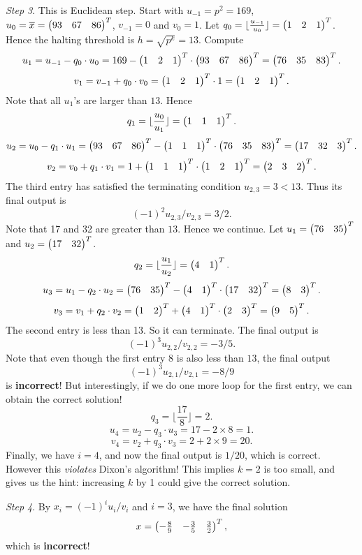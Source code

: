 \documentclass[12pt]{article}
\theoremstyle{plain}
\begin{document}
\emph{Step 3}. This is Euclidean step. Start with $u_{-1} = p^2 = 169$, $u_0=\overline{x} = \begin{pmatrix}93 & 67 & 86\end{pmatrix}^T$, $v_{-1} = 0$ and $v_0=1$. Let $q_0 = \lfloor \frac{u_{-1}}{u_0} \rfloor = \begin{pmatrix}1 & 2 & 1\end{pmatrix}^T$. Hence the halting threshold is $h = \sqrt{p^k} = 13$. Compute
$$u_1 = u_{-1} - q_0\cdot u_0 = 169 - \begin{pmatrix}1 & 2 & 1\end{pmatrix}^T \cdot \begin{pmatrix}93 & 67 & 86\end{pmatrix}^T = \begin{pmatrix}76 & 35 & 83\end{pmatrix}^T.$$
$$v_1 = v_{-1} + q_0\cdot v_0 = \begin{pmatrix}1 & 2 & 1\end{pmatrix}^T \cdot 1 = \begin{pmatrix}1 & 2 & 1\end{pmatrix}^T.$$
Note that all $u_1$'s are larger than $13$. Hence
$$q_1 = \lfloor \frac{u_0}{u_1} \rfloor = \begin{pmatrix}1 & 1 & 1\end{pmatrix}^T.$$
$$u_2 = u_0 - q_1\cdot u_1 = \begin{pmatrix}93 & 67 & 86\end{pmatrix}^T - \begin{pmatrix}1 & 1 & 1\end{pmatrix}^T \cdot \begin{pmatrix}76 & 35 & 83\end{pmatrix}^T = \begin{pmatrix}17 & 32 & 3\end{pmatrix}^T.$$
$$v_2 = v_0 + q_1\cdot v_1 = 1 + \begin{pmatrix}1 & 1 & 1\end{pmatrix}^T \cdot \begin{pmatrix}1 & 2 & 1\end{pmatrix}^T = \begin{pmatrix}2&3&2\end{pmatrix}^T.$$
The third entry has satisfied the terminating condition $u_{2,3} = 3 < 13$. Thus its final output is 
$$(-1)^2u_{2,3}/v_{2,3} = 3/2.$$
Note that 17 and 32 are greater than $13$. Hence we continue. Let $u_1 = \begin{pmatrix}76 & 35\end{pmatrix}^T$ and $u_2 = \begin{pmatrix}17 & 32\end{pmatrix}^T$.
$$q_2 = \lfloor \frac{u_1}{u_2} \rfloor = \begin{pmatrix}4 & 1\end{pmatrix}^T.$$
$$u_3 = u_1 - q_2\cdot u_2 = \begin{pmatrix}76 & 35\end{pmatrix}^T - \begin{pmatrix}4 & 1\end{pmatrix}^T \cdot \begin{pmatrix}17 & 32\end{pmatrix}^T = \begin{pmatrix}8 & 3\end{pmatrix}^T.$$
$$v_3 = v_1 + q_2\cdot v_2 = \begin{pmatrix}1 & 2\end{pmatrix}^T + \begin{pmatrix}4 & 1\end{pmatrix}^T \cdot \begin{pmatrix}2&3\end{pmatrix}^T = \begin{pmatrix}9 & 5\end{pmatrix}^T.$$
The second entry is less than 13. So it can terminate. The final output is 
$$(-1)^3u_{2,2}/v_{2,2} = -3/5.$$
Note that even though the first entry 8 is also less than $13$, the final output 
$$(-1)^3u_{2,1}/v_{2,1} = -8/9$$
 is {\bf incorrect}!
But interestingly, if we do one more loop for the first entry, we can obtain the correct solution!
$$q_3 = \lfloor \frac{17}{8} \rfloor = 2.$$
$$u_4 = u_2 - q_3\cdot u_3 = 17 - 2\times 8 = 1.$$
$$v_4 = v_2 + q_3\cdot v_3 = 2 + 2\times 9 = 20.$$
Finally, we have $i=4$, and now the final output is $1/20$, which is correct.
However this {\it violates} Dixon's algorithm! This implies $k=2$ is too small, and gives us the hint: increasing $k$ by 1 could give the correct solution.

\emph{Step 4}. By $x_i = (-1)^i u_i/v_i$ and $i=3$, we have the final solution
$$x = \begin{pmatrix}-\frac{8}{9} & -\frac{3}{5} & \frac{3}{2}\end{pmatrix}^T,$$
which is {\bf incorrect}!
\end{document}
